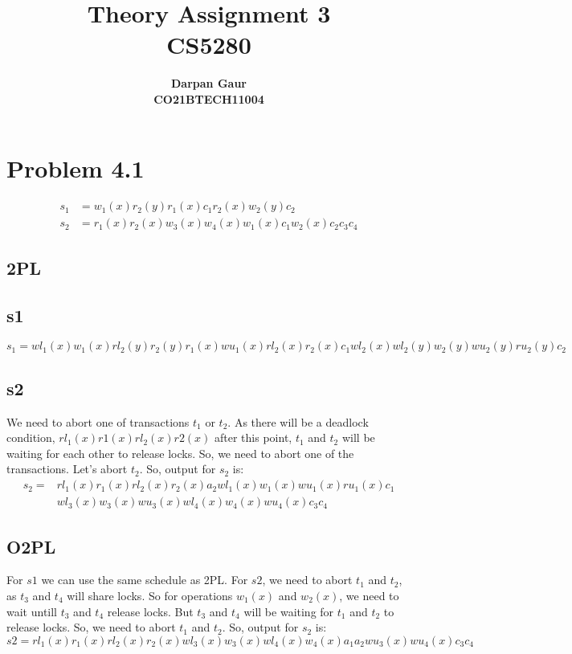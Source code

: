 \documentclass[12pt]{article}
\title{
    \textbf{Theory Assignment 3} \\ 
    \textbf{CS5280} \\
}
\author{
    \textbf{Darpan Gaur} \\
    \textbf{CO21BTECH11004}
}
\date{}
\begin{document}
\maketitle

\hrulefill

\section*{Problem 4.1}
\begin{equation*}
    \begin{split}
        s_1 &= w_1(x) r_2(y) r_1(x) c_1 r_2(x) w_2(y) c_2 \\
        s_2 &= r_1(x) r_2(x) w_3(x) w_4(x) w_1(x) c_1 w_2(x) c_2 c_3 c_4
    \end{split}
\end{equation*}
\subsection*{2PL}
\subsection*{s1}
\begin{equation*}
    s_1 = wl_1(x) w_1(x) rl_2(y) r_2(y) r_1(x) wu_1(x) rl_2(x) r_2(x) c_1 wl_2(x) wl_2(y) w_2(y) wu_2(y) ru_2(y) c_2 
\end{equation*}
\subsection*{s2}
We need to abort one of transactions $t_1$ or $t_2$. As there will be a deadlock condition, $rl_1(x) r1(x) rl_2(x) r2(x)$ after this point, $t_1$ and $t_2$ will be waiting for each other to release locks. So, we need to abort one of the transactions. Let's abort $t_2$. So, output for $s_2$ is:
\begin{equation*}
    \begin{split}
        s_2 = &rl_1(x) r_1(x) rl_2(x) r_2(x) a_2 wl_1(x) w_1(x) wu_1(x) ru_1(x) c_1\\
            & wl_3(x) w_3(x) wu_3(x) wl_4(x) w_4(x) wu_4(x) c_3 c_4
    \end{split}
\end{equation*}

\subsection*{O2PL}
For $s1$ we can use the same schedule as 2PL. 
For $s2$, we need to abort $t_1$ and $t_2$, as $t_3$ and $t_4$ will share locks. So for operations $w_1(x)$ and $w_2(x)$, we need to wait untill $t_3$ and $t_4$ release locks. But $t_3$ and $t_4$ will be waiting for $t_1$ and $t_2$ to release locks. So, we need to abort $t_1$ and $t_2$. So, output for $s_2$ is:
\begin{equation*}
    s2 = rl_1(x) r_1(x) rl_2(x) r_2(x) wl_3(x) w_3(x) wl_4(x) w_4(x) a_1 a_2 wu_3(x) wu_4(x) c_3 c_4
\end{equation*}
\end{document}
